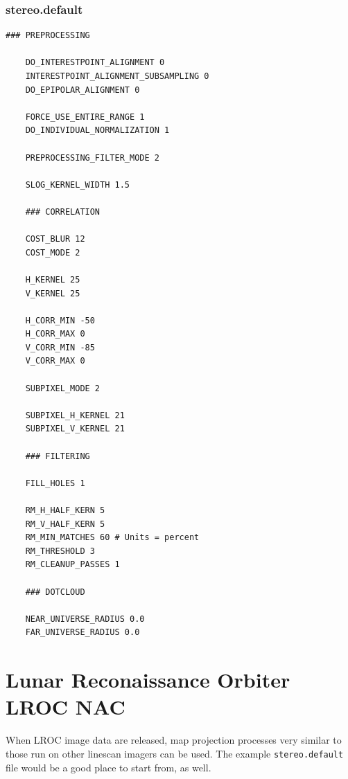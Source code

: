 \vfill

\subsubsection*{stereo.default}

\begin{center}\begin{minipage}{5.5in}
\begin{Verbatim}[frame=single,fontsize=\small,label=stereo.default for MOC North Tharsis]
    ### PREPROCESSING

    DO_INTERESTPOINT_ALIGNMENT 0
    INTERESTPOINT_ALIGNMENT_SUBSAMPLING 0
    DO_EPIPOLAR_ALIGNMENT 0

    FORCE_USE_ENTIRE_RANGE 1
    DO_INDIVIDUAL_NORMALIZATION 1

    PREPROCESSING_FILTER_MODE 2

    SLOG_KERNEL_WIDTH 1.5

    ### CORRELATION

    COST_BLUR 12
    COST_MODE 2

    H_KERNEL 25
    V_KERNEL 25

    H_CORR_MIN -50
    H_CORR_MAX 0
    V_CORR_MIN -85
    V_CORR_MAX 0

    SUBPIXEL_MODE 2

    SUBPIXEL_H_KERNEL 21
    SUBPIXEL_V_KERNEL 21

    ### FILTERING

    FILL_HOLES 1

    RM_H_HALF_KERN 5
    RM_V_HALF_KERN 5
    RM_MIN_MATCHES 60 # Units = percent
    RM_THRESHOLD 3
    RM_CLEANUP_PASSES 1

    ### DOTCLOUD

    NEAR_UNIVERSE_RADIUS 0.0
    FAR_UNIVERSE_RADIUS 0.0
\end{Verbatim}
\end{minipage}\end{center}

\section{Lunar Reconaissance Orbiter LROC NAC}

When \ac{LROC} image data are released, map projection processes
very similar to those run on other linescan imagers can be used.
The example \texttt{stereo.default} file would be a good place to
start from, as well.

